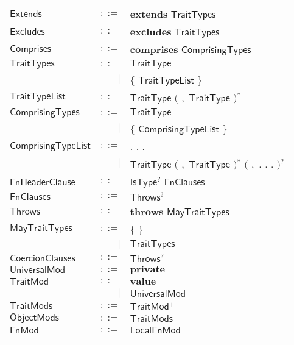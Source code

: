  
\begin{longtable}[l]{p{3cm}rl}
$\mathsf{Extends}$ &  $\mathsf{::=}$  & $\mathbf{extends}$ $\mathsf{TraitTypes}$ \\
$\mathsf{Excludes}$ &  $\mathsf{::=}$  & $\mathbf{excludes}$ $\mathsf{TraitTypes}$ \\
$\mathsf{Comprises}$ &  $\mathsf{::=}$  & $\mathbf{comprises}$ $\mathsf{ComprisingTypes}$ \\
$\mathsf{TraitTypes}$ &  $\mathsf{::=}$  & $\mathsf{TraitType}$ \\
 & $\big|$ &  $\mathbf{\{}$ $\mathsf{TraitTypeList}$ $\mathbf{\}}$ \\
$\mathsf{TraitTypeList}$ &  $\mathsf{::=}$  & $\mathsf{TraitType}$ $\big($  $\mathbf{,}$ $\mathsf{TraitType}$ $\big)$$^*$ \\
$\mathsf{ComprisingTypes}$ &  $\mathsf{::=}$  & $\mathsf{TraitType}$ \\
 & $\big|$ &  $\mathbf{\{}$ $\mathsf{ComprisingTypeList}$ $\mathbf{\}}$ \\
$\mathsf{ComprisingTypeList}$ &  $\mathsf{::=}$  & $\mathbf{.}$ $\mathbf{.}$ $\mathbf{.}$ \\
 & $\big|$ &  $\mathsf{TraitType}$ $\big($  $\mathbf{,}$ $\mathsf{TraitType}$ $\big)$$^*$ $\big($  $\mathbf{,}$ $\mathbf{.}$ $\mathbf{.}$ $\mathbf{.}$ $\big)$$^?$ \\
$\mathsf{FnHeaderClause}$ &  $\mathsf{::=}$  & $\mathsf{IsType}$$^?$ $\mathsf{FnClauses}$ \\
$\mathsf{FnClauses}$ &  $\mathsf{::=}$  & $\mathsf{Throws}$$^?$ \\
$\mathsf{Throws}$ &  $\mathsf{::=}$  & $\mathbf{throws}$ $\mathsf{MayTraitTypes}$ \\
$\mathsf{MayTraitTypes}$ &  $\mathsf{::=}$  & $\mathbf{\{}$ $\mathbf{\}}$ \\
 & $\big|$ &  $\mathsf{TraitTypes}$ \\
$\mathsf{CoercionClauses}$ &  $\mathsf{::=}$  & $\mathsf{Throws}$$^?$ \\
$\mathsf{UniversalMod}$ &  $\mathsf{::=}$  & $\mathbf{private}$ \\
$\mathsf{TraitMod}$ &  $\mathsf{::=}$  & $\mathbf{value}$ \\
 & $\big|$ &  $\mathsf{UniversalMod}$ \\
$\mathsf{TraitMods}$ &  $\mathsf{::=}$  & $\mathsf{TraitMod}$$^+$ \\
$\mathsf{ObjectMods}$ &  $\mathsf{::=}$  & $\mathsf{TraitMods}$ \\
$\mathsf{FnMod}$ &  $\mathsf{::=}$  & $\mathsf{LocalFnMod}$ \\
$$
\end{longtable}

